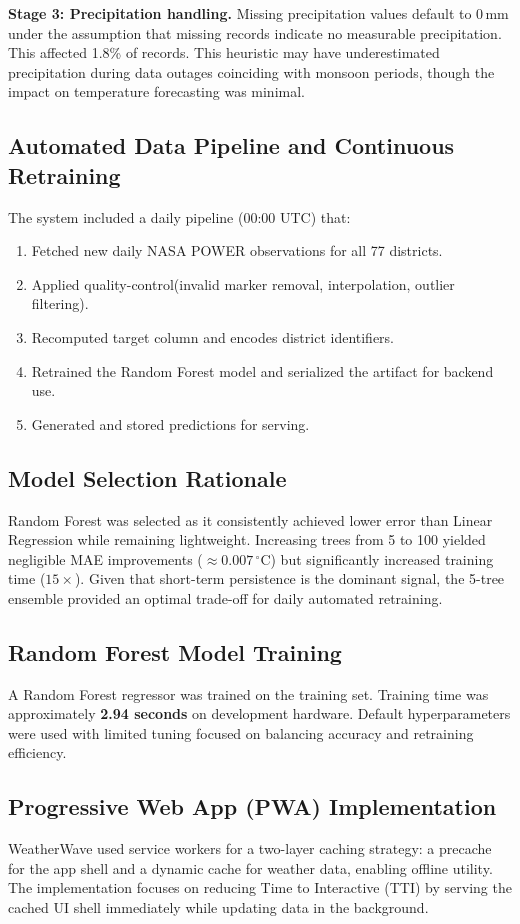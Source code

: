 \documentclass[conference]{IEEEtran}
\begin{document}
\textbf{Stage 3: Precipitation handling.} Missing precipitation values default to 0\,mm under the assumption that missing records indicate no measurable precipitation. This affected 1.8\% of records. This heuristic may have underestimated precipitation during data outages coinciding with monsoon periods, though the impact on temperature forecasting was minimal.

\subsection{Automated Data Pipeline and Continuous Retraining}
The system included a daily pipeline (00:00 UTC) that:
\begin{enumerate}
  \item Fetched new daily NASA POWER observations for all 77 districts.
  \item Applied quality-control(invalid marker removal, interpolation, outlier filtering).
  \item Recomputed target column and encodes district identifiers.
  \item Retrained the Random Forest model and serialized the artifact for backend use.
  \item Generated and stored predictions for serving.
\end{enumerate}


\subsection{Model Selection Rationale}
Random Forest was selected as it consistently achieved lower error than Linear Regression while remaining lightweight. Increasing trees from 5 to 100 yielded negligible MAE improvements ($\approx 0.007\,^\circ\text{C}$) but significantly increased training time ($15\times$). Given that short-term persistence is the dominant signal, the 5-tree ensemble provided an optimal trade-off for daily automated retraining.

\subsection{Random Forest Model Training}
A Random Forest regressor was trained on the training set. Training time was approximately \textbf{2.94 seconds} on development hardware. Default hyperparameters were used with limited tuning focused on balancing accuracy and retraining efficiency.

\subsection{Progressive Web App (PWA) Implementation}
WeatherWave used service workers for a two-layer caching strategy: a precache for the app shell and a dynamic cache for weather data, enabling offline utility. The implementation focuses on reducing Time to Interactive (TTI) by serving the cached UI shell immediately while updating data in the background.
\end{document}
